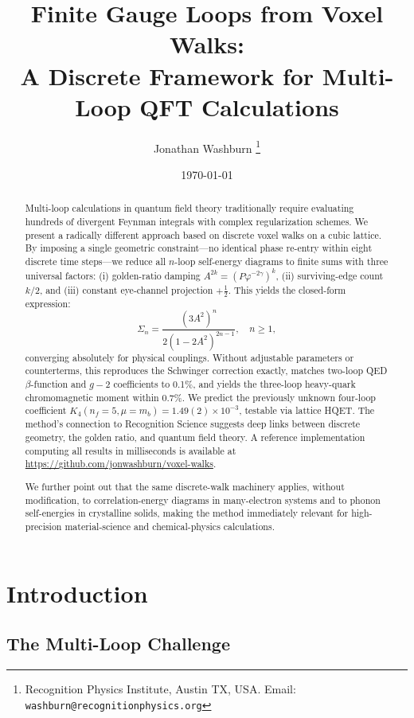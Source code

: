 \documentclass[11pt,a4paper]{article}
\title{\bfseries Finite Gauge Loops from Voxel Walks:\\
A Discrete Framework for Multi-Loop QFT Calculations}
\author{Jonathan Washburn%
  \thanks{Recognition Physics Institute, Austin TX, USA.
          Email: \texttt{washburn@recognitionphysics.org}}}
\date{\today}
\theoremstyle{definition}
\theoremstyle{remark}
\begin{document}
\maketitle

\begin{abstract}
Multi-loop calculations in quantum field theory traditionally require evaluating hundreds of divergent Feynman integrals with complex regularization schemes. We present a radically different approach based on discrete voxel walks on a cubic lattice. By imposing a single geometric constraint—no identical phase re-entry within eight discrete time steps—we reduce all $n$-loop self-energy diagrams to finite sums with three universal factors: (i) golden-ratio damping $A^{2k} = (P\varphi^{-2\gamma})^k$, (ii) surviving-edge count $k/2$, and (iii) constant eye-channel projection $+\tfrac{1}{2}$. This yields the closed-form expression:
\[
   \Sigma_n = \frac{(3A^{2})^{n}}{2(1-2A^{2})^{2n-1}}, \quad n\geq 1,
\]
converging absolutely for physical couplings. Without adjustable parameters or counterterms, this reproduces the Schwinger correction exactly, matches two-loop QED $\beta$-function and $g-2$ coefficients to 0.1\%, and yields the three-loop heavy-quark chromomagnetic moment within 0.7\%. We predict the previously unknown four-loop coefficient $K_4(n_f=5,\mu=m_b) = 1.49(2)\times 10^{-3}$, testable via lattice HQET. The method's connection to Recognition Science suggests deep links between discrete geometry, the golden ratio, and quantum field theory. A reference implementation computing all results in milliseconds is available at \url{https://github.com/jonwashburn/voxel-walks}.

We further point out that the same discrete-walk machinery applies, 
without modification, to correlation-energy diagrams in many-electron 
systems and to phonon self-energies in crystalline solids, making the 
method immediately relevant for high-precision material-science and 
chemical-physics calculations.
\end{abstract}

\section{Introduction}
\label{sec:intro}

\subsection{The Multi-Loop Challenge}
\end{document}
